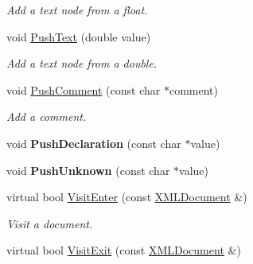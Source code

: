 \begin{DoxyCompactItemize}
\begin{DoxyCompactList}\small\item\em Add a text node from a float. \end{DoxyCompactList}\item 
\mbox{\label{classtinyxml2_1_1XMLPrinter_aa715302dfc09473c77c853cbd5431965}} 
void \hyperlink{classtinyxml2_1_1XMLPrinter_aa715302dfc09473c77c853cbd5431965}{Push\+Text} (double value)
\begin{DoxyCompactList}\small\item\em Add a text node from a double. \end{DoxyCompactList}\item 
\mbox{\label{classtinyxml2_1_1XMLPrinter_afc8416814219591c2fd5656e0c233140}} 
void \hyperlink{classtinyxml2_1_1XMLPrinter_afc8416814219591c2fd5656e0c233140}{Push\+Comment} (const char $\ast$comment)
\begin{DoxyCompactList}\small\item\em Add a comment. \end{DoxyCompactList}\item 
\mbox{\label{classtinyxml2_1_1XMLPrinter_a2fe3565e262594efc6c0276723c83fe7}} 
void {\bfseries Push\+Declaration} (const char $\ast$value)
\item 
\mbox{\label{classtinyxml2_1_1XMLPrinter_ab1efc6d1548505e9984185f58f54b713}} 
void {\bfseries Push\+Unknown} (const char $\ast$value)
\item 
\mbox{\label{classtinyxml2_1_1XMLPrinter_a9aa1de11a55a07db55a90fde37d7afad}} 
virtual bool \hyperlink{classtinyxml2_1_1XMLPrinter_a9aa1de11a55a07db55a90fde37d7afad}{Visit\+Enter} (const \hyperlink{classtinyxml2_1_1XMLDocument}{X\+M\+L\+Document} \&)
\begin{DoxyCompactList}\small\item\em Visit a document. \end{DoxyCompactList}\item 
\mbox{\label{classtinyxml2_1_1XMLPrinter_a15fc1f2b922f540917dcf52808737b29}} 
virtual bool \hyperlink{classtinyxml2_1_1XMLPrinter_a15fc1f2b922f540917dcf52808737b29}{Visit\+Exit} (const \hyperlink{classtinyxml2_1_1XMLDocument}{X\+M\+L\+Document} \&)

\end{DoxyCompactItemize}
